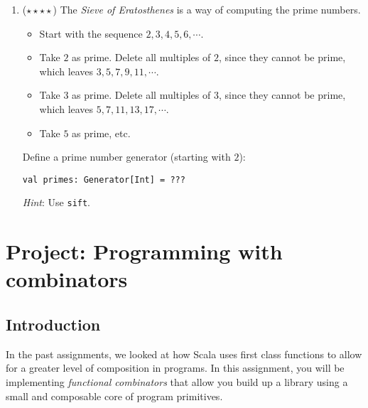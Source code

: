\documentclass[9pt]{extbook}
\begin{document}
\begin{enumerate}
\item ($\star\star\star\star$) The \emph{Sieve of Eratosthenes} is a way of computing the prime numbers.

\begin{itemize}

\item Start with the sequence $2, 3, 4, 5, 6, \cdots$.

\item Take $2$ as prime. Delete all multiples of $2$, since they cannot be prime, which leaves $3, 5, 7, 9, 11, \cdots$.

\item Take $3$ as prime. Delete all multiples of $3$, since they cannot be prime, which leaves $5, 7, 11, 13, 17, \cdots$.

\item Take $5$ as prime, etc.

\end{itemize}

Define a prime number generator (starting with $2$):

\begin{lstlisting}
val primes: Generator[Int] = ???
\end{lstlisting}

\emph{Hint}: Use \lstinline|sift|.

\end{enumerate}



\chapter{Project: Programming with combinators}

\section{Introduction}
In the past assignments, we looked at how Scala uses first class functions
to allow for a greater level of composition in programs. In this assignment,
you will be implementing \textit{functional combinators} that allow you
build up a library using a small and composable core of program primitives.
\\ \\
\end{document}
